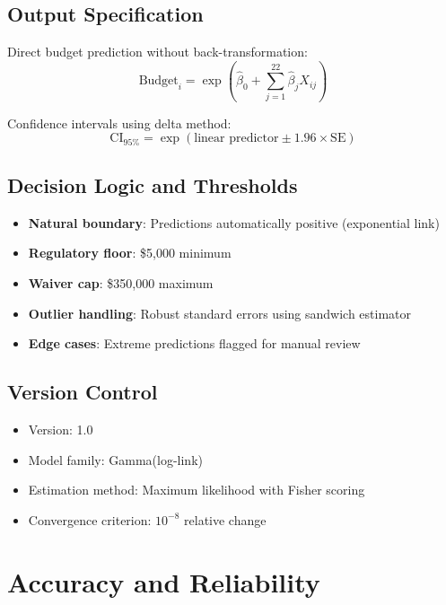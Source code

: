 \subsection{Output Specification}

Direct budget prediction without back-transformation:
\begin{equation}
\text{Budget}_i = \exp\left(\hat{\beta}_0 + \sum_{j=1}^{22} \hat{\beta}_j X_{ij}\right)
\end{equation}

Confidence intervals using delta method:
\begin{equation}
\text{CI}_{95\%} = \exp\left(\text{linear predictor} \pm 1.96 \times \text{SE}\right)
\end{equation}

\subsection{Decision Logic and Thresholds}

\begin{itemize}
    \item \textbf{Natural boundary}: Predictions automatically positive (exponential link)
    \item \textbf{Regulatory floor}: \$5,000 minimum
    \item \textbf{Waiver cap}: \$350,000 maximum
    \item \textbf{Outlier handling}: Robust standard errors using sandwich estimator
    \item \textbf{Edge cases}: Extreme predictions flagged for manual review
\end{itemize}

\subsection{Version Control}
\begin{itemize}
    \item Version: 1.0
    \item Model family: Gamma(log-link)
    \item Estimation method: Maximum likelihood with Fisher scoring
    \item Convergence criterion: $10^{-8}$ relative change
\end{itemize}

\section{Accuracy and Reliability}

